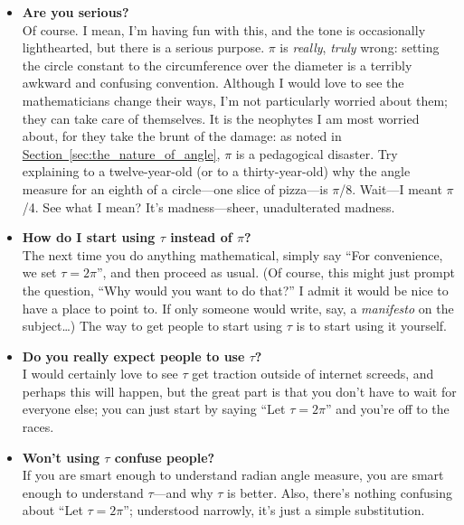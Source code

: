 \documentclass{article}
\begin{document}
\begin{itemize}

  \item \textbf{Are you serious?} \\ Of course. I mean, I'm having fun with this, and the tone is occasionally lighthearted, but there is a serious purpose. $\pi$ is \emph{really}, \emph{truly} wrong: setting the circle constant to the circumference over the diameter is a terribly awkward and confusing convention. Although I would love to see the mathematicians change their ways, I'm not particularly worried about them; they can take care of themselves. It is the neophytes I am most worried about, for they take the brunt of the damage: as noted in \hyperref[sec:the_nature_of_angle]{Section~}\ref{sec:the_nature_of_angle}, $\pi$ is a pedagogical disaster. Try explaining to a twelve-year-old (or to a thirty-year-old) why the angle measure for an eighth of a circle---one slice of pizza---is $\pi$/8. Wait---I meant $\pi$/4. See what I mean? It's madness---sheer, unadulterated madness.

  \item \textbf{How do I start using $\tau$ instead of $\pi$?} \\ The next time you do anything mathematical, simply say ``For convenience, we set $\tau = 2\pi$'', and then proceed as usual. (Of course, this might just prompt the question, ``Why would you want to do that?'' I admit it would be nice to have a place to point to. If only someone would write, say, a \emph{manifesto} on the subject\ldots) The way to get people to start using $\tau$ is to start using it yourself. 

  \item \textbf{Do you really expect people to use $\tau$?} \\ I would certainly love to see $\tau$ get traction outside of internet screeds, and perhaps this will happen, but the great part is that you don't have to wait for everyone else; you can just start by saying ``Let $\tau = 2\pi$'' and you're off to the races. 
  
  \item \textbf{Won't using $\tau$ confuse people?} \\ If you are smart enough to understand radian angle measure, you are smart enough to understand $\tau$---and why $\tau$ is better. Also, there's nothing confusing about ``Let $\tau = 2\pi$''; understood narrowly, it's just a simple substitution.


\end{itemize}
\end{document}
